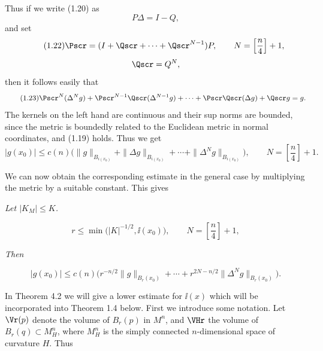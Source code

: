 Thus if we write (1.20) as
\begin{equation}\tag{1.21}
 P\Delta = I - Q,
\end{equation}
and set
\begin{equation}\tag{1.22}
 \Pscr = (I + \Qscr + \cdots + \Qscr^{N-1})P,\qquad
 N=\left[\frac{n}{4}\right]+1,
\end{equation}
\[
\Qscr = Q^N,
\]
then it follows easily that
\begin{equation}\tag{1.23}
 \Pscr^N(\Delta^N g) + \Pscr^{N-1}\Qscr(\Delta^{N-1}g) + \cdots + \Pscr\Qscr(\Delta g) + \Qscr g = g.
\end{equation}
The kernels on the left hand are continuous and their sup norms are bounded,
since the metric is boundedly related to the Euclidean metric in normal
coordinates, and (1.19) holds. Thus we get
\begin{equation}\tag{1.24}
|g(x_0)| \leq c(n)\bigl(\|g\|_{B_{i(x_0)}} + \|\Delta g\|_{B_{i(x_0)}} + \cdots + \|\Delta^N g\|_{B_{i(x_0)}}\bigr),
\qquad
N=\left[\frac{n}{4}\right]+1.
\end{equation}

We can now obtain the corresponding estimate in the general case by
multiplying the metric by a suitable constant. This gives

\begin{proposition}
\label{prop:local-elliptic-estimate}

\textit{Let $\lvert K_M\rvert \leq K$.}

\begin{equation}\tag{1.25}
r \leq \min\bigl(|K|^{-1/2}, \ii(x_0)\bigr),\qquad
N=\left[\frac{n}{4}\right]+1,
\end{equation}

\textit{Then}

\begin{equation}\tag{1.26}
|g(x_0)| \leq c(n)\bigl(r^{-n/2}\|g\|_{B_r(x_0)} + \cdots + r^{2N-n/2}\|\Delta^N g\|_{B_r(x_0)}\bigr).
\end{equation}
\end{proposition}

In Theorem 4.2 we will give a lower estimate for $\ii(x)$ which will be
incorporated into Theorem 1.4 below. First we introduce some notation.
Let $\Vr(p)$ denote the volume of $B_r(p)$ in $M^n$, and $\VHr$ the volume of
$B_r(q)\subset M_H^n$, where $M_H^n$ is the simply connected $n$-dimensional
space of curvature $H$. Thus

